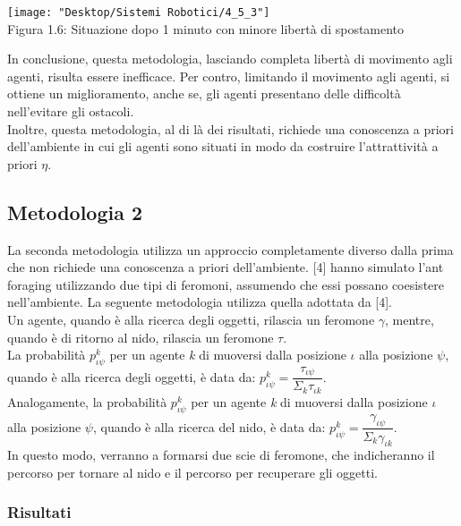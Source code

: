 \documentclass[12pt,a4paper,openright,twoside]{report}
\begin{document}
\begin{center}  
	\texttt{[image: "Desktop/Sistemi Robotici/4\_5\_3"]}
	\\Figura 1.6: Situazione dopo 1 minuto con minore libertà di spostamento
\end{center}

In conclusione, questa metodologia, lasciando completa libertà di movimento agli agenti, risulta essere inefficace. Per contro, limitando il movimento agli agenti, si ottiene un miglioramento, anche se, gli agenti presentano delle difficoltà nell'evitare gli ostacoli.\\
Inoltre, questa metodologia, al di là dei risultati, richiede una conoscenza a priori dell'ambiente in cui gli agenti sono situati in modo da costruire l'attrattività a priori $\eta$.

\subsection{Metodologia 2}

La seconda metodologia utilizza un approccio completamente diverso dalla prima che non richiede una conoscenza a priori dell'ambiente. [4] hanno simulato l'ant foraging utilizzando due tipi di feromoni, assumendo che essi possano coesistere nell'ambiente. La seguente metodologia utilizza quella adottata da [4].\\
Un agente, quando è alla ricerca degli oggetti, rilascia un feromone $\gamma$, mentre, quando è di ritorno al nido, rilascia un feromone $\tau$.\\
La probabilità $p^k_{\iota\psi}$ per un agente \textit{k} di muoversi dalla posizione $\iota$ alla posizione $\psi$, quando è alla ricerca degli oggetti, è data da: $p^k_{\iota\psi}= \dfrac{\tau_{\iota\psi}}{\Sigma_k\tau_{\iota k}}$.\\
Analogamente, la probabilità $p^k_{\iota\psi}$ per un agente \textit{k} di muoversi dalla posizione $\iota$ alla posizione $\psi$, quando è alla ricerca del nido, è data da: $p^k_{\iota\psi}= \dfrac{\gamma_{\iota\psi}}{\Sigma_k\gamma_{\iota k}}$.\\
In questo modo, verranno a formarsi due scie di feromone, che indicheranno il percorso per tornare al nido e il percorso per recuperare gli oggetti.\\

\subsubsection{Risultati}
\end{document}
